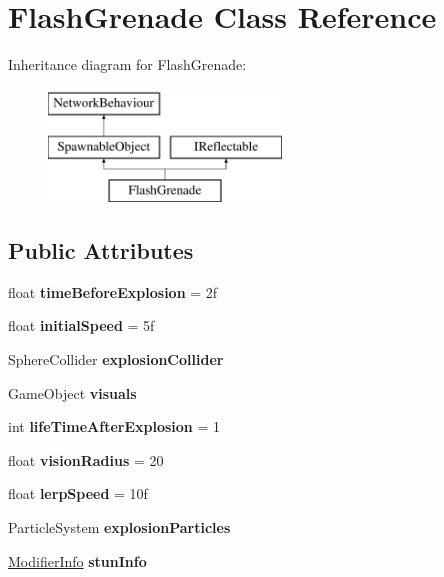 \hypertarget{class_flash_grenade}{}\section{Flash\+Grenade Class Reference}
\label{class_flash_grenade}
Inheritance diagram for Flash\+Grenade\+:\begin{figure}[H]
\begin{center}
\leavevmode
\includegraphics[height=3.000000cm]{class_flash_grenade}
\end{center}
\end{figure}
\subsection*{Public Attributes}
\begin{DoxyCompactItemize}
\item 
\hypertarget{class_flash_grenade_a53abf0ad0a13b559b3db1b99fe311208}{}\label{class_flash_grenade_a53abf0ad0a13b559b3db1b99fe311208} 
float {\bfseries time\+Before\+Explosion} = 2f
\item 
\hypertarget{class_flash_grenade_acb642d8242758fc601a3aa5adebd4bc7}{}\label{class_flash_grenade_acb642d8242758fc601a3aa5adebd4bc7} 
float {\bfseries initial\+Speed} = 5f
\item 
\hypertarget{class_flash_grenade_a193c982c397ff25fd8514459dfe72c7f}{}\label{class_flash_grenade_a193c982c397ff25fd8514459dfe72c7f} 
Sphere\+Collider {\bfseries explosion\+Collider}
\item 
\hypertarget{class_flash_grenade_a0b3ed27b6887b8554340a6e22c7b5bfc}{}\label{class_flash_grenade_a0b3ed27b6887b8554340a6e22c7b5bfc} 
Game\+Object {\bfseries visuals}
\item 
\hypertarget{class_flash_grenade_ae975599a858b53833258a27587beb3ae}{}\label{class_flash_grenade_ae975599a858b53833258a27587beb3ae} 
int {\bfseries life\+Time\+After\+Explosion} = 1
\item 
\hypertarget{class_flash_grenade_aedcd6d71329b7d8e66b183f2a6cd0aee}{}\label{class_flash_grenade_aedcd6d71329b7d8e66b183f2a6cd0aee} 
float {\bfseries vision\+Radius} = 20
\item 
\hypertarget{class_flash_grenade_a1383b7f0c1dd6faec4854048d41b05d7}{}\label{class_flash_grenade_a1383b7f0c1dd6faec4854048d41b05d7} 
float {\bfseries lerp\+Speed} = 10f
\item 
\hypertarget{class_flash_grenade_a195aafba00e132e1709356cb3f2daa6d}{}\label{class_flash_grenade_a195aafba00e132e1709356cb3f2daa6d} 
Particle\+System {\bfseries explosion\+Particles}
\item 
\hypertarget{class_flash_grenade_a541001a632f4b87c3cedf43fae46eb9b}{}\label{class_flash_grenade_a541001a632f4b87c3cedf43fae46eb9b} 
\hyperlink{struct_modifier_info}{Modifier\+Info} {\bfseries stun\+Info}
\end{DoxyCompactItemize}
